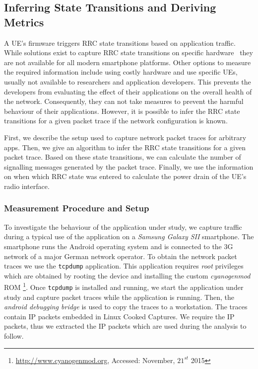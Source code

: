 \subsection{Inferring State Transitions and Deriving Metrics}\label{sec:network:network_traces:performance_evaluation}
A \gls{UE}’s firmware triggers \gls{RRC} state transitions based on application traffic.
While solutions exist to capture RRC state transitions on specific hardware~\cite{zayas2010} they are not available for all modern smartphone platforms.
Other options to measure the required information include using costly hardware and use specific \glspl{UE}, usually not available to researchers and application developers.
This prevents the developers from evaluating the effect of their applications on the overall health
of the network.
Consequently, they can not take measures to prevent the harmful behaviour of their applications.
However, it is possible to infer the \gls{RRC} state transitions for a given packet trace if the network configuration is known.

First, we describe the setup used to capture network packet traces for arbitrary apps.
Then, we give an algorithm to infer the \gls{RRC} state transitions for a given packet trace.
Based on these state transitions, we can calculate the number of signalling messages generated
by the packet trace. 
Finally, we use the information on when which \gls{RRC} state was entered to calculate the power drain of the \gls{UE}’s radio interface.

\subsubsection*{Measurement Procedure and Setup}\label{sec:network:network_traces:performance_evaluation:measurement}
To investigate the behaviour of the application under study, we capture traffic during a typical use of the application on a \emph{Samsung Galaxy SII} smartphone.
The smartphone runs the Android operating system and is connected to the \gls{3G} network of a major German network operator.
To obtain the network packet traces we use the \texttt{tcpdump} application.
This application requires \emph{root} privileges which are obtained by rooting the device and installing the custom \emph{cyanogenmod} ROM \footnote{\url{http://www.cyanogenmod.org}, Accessed: November, \(21^{st}\) 2015}.
Once \texttt{tcpdump} is installed and running, we start the application under study and capture packet traces while the application is running.
Then, the \emph{android debugging bridge} is used to copy the traces to a workstation.
The traces contain \gls{IP} packets embedded in Linux Cooked Captures.
We require the \gls{IP} packets, thus we extracted the \gls{IP} packets which are used during the analysis to follow.

